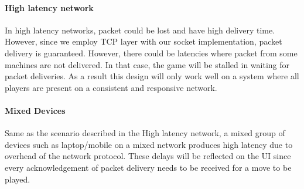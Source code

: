 \paragraph*{High latency network}

In high latency networks, packet could be lost and have high delivery time. However, since we employ TCP layer with our socket implementation, packet delivery is guaranteed. However, there could be latencies where packet from some machines are not delivered. In that case, the game will be stalled in waiting for packet deliveries. As a result this design will only work well on a system where all players are present on a consistent and responsive network.

\paragraph*{Mixed Devices}

Same as the scenario described in the High latency network, a mixed group of devices such as laptop/mobile on a mixed network produces high latency due to overhead of the network protocol. These delays will be reflected on the UI since every acknowledgement of packet delivery needs to be received for a move to be played.
